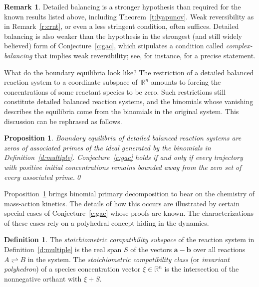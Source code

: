 \documentclass[12pt]{amsart}
\numberwithin{equation}{section}
\newtheorem{prop}[thm]{Proposition}
\theoremstyle{definition}
\newtheorem{defn}[thm]{Definition}
\newtheorem{remark}[thm]{Remark}
\begin{document}
\begin{remark}\label{r:crnt'}
Detailed balancing is a stronger hypothesis than required for the
known results listed above, including Theorem~\ref{t:lyapunov}.  Weak
reversibility as in Remark~\ref{r:crnt}, or even a less stringent
condition, often suffices.  Detailed balancing is also weaker than the
hypothesis in the strongest (and still widely believed) form of
Conjecture~\ref{c:gac}, which stipulates a condition called
\emph{complex-balancing} that implies weak reversibility; see, for
instance, \cite[\S4.2]{AS09} for a precise statement.
\end{remark}

What do the boundary equilibria look like?  The restriction of a
detailed balanced reaction system to a coordinate subspace of~${\mathbb{R}}^n$
amounts to forcing the concentrations of some reactant species to be
zero.  Such restrictions still constitute detailed balanced reaction
systems, and the binomials whose vanishing describes the equilibria
come from the binomials in the original system.  This discussion can
be rephrased as follows.

\begin{prop}\label{p:gac}
Boundary equilibria of detailed balanced reaction systems are zeros of
associated primes of the ideal generated by the binomials in
Definition~\ref{d:multiple}.  Conjecture~\ref{c:gac} holds if and only
if every trajectory with positive initial concentrations remains
bounded away from the zero set of every associated prime.\qed
\end{prop}

Proposition~\ref{p:gac} brings binomial primary decomposition to bear
on the chemistry of mass-action kinetics.  The details of how this
occurs are illustrated by certain special cases of
Conjecture~\ref{c:gac} whose proofs are known.  The characterizations
of these cases rely on a polyhedral concept hiding in the dynamics.

\begin{defn}\label{d:stoichiometric}
The \emph{stoichiometric compatibility subspace} of the reaction
system in Definition~\ref{d:multiple} is the real span $S$ of the
vectors ${\mathbf{a}} - {\mathbf{b}}$ over all reactions $A \rightleftharpoons B$ in the
system.  The \emph{stoichiometric compatibility class} (or
\emph{invariant polyhedron}) of a species concentration vector $\xi
\in {\mathbb{R}}^n$ is the intersection of the nonnegative orthant with $\xi +
S$.
\end{defn}
\end{document}
